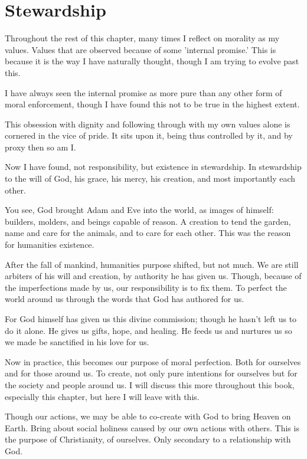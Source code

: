 \section{Stewardship}
\par Throughout the rest of this chapter, many times I reflect on morality as my values. Values that are observed because of some 'internal promise.' This is because it is the way I have naturally thought, though I am trying to evolve past this.
\par I have always seen the internal promise as more pure than any other form of moral enforcement, though I have found this not to be true in the highest extent.
\par This obsession with dignity and following through with my own values alone is cornered in the vice of pride. It sits upon it, being thus controlled by it, and by proxy then so am I.
\par Now I have found, not responsibility, but existence in stewardship. In stewardship to the will of God, his grace, his mercy, his creation, and most importantly each other.
\par You see, God brought Adam and Eve into the world, as images of himself: builders, molders, and beings capable of reason. A creation to tend the garden, name and care for the animals, and to care for each other. This was the reason for humanities existence.
\par After the fall of mankind, humanities purpose shifted, but not much. We are still arbiters of his will and creation, by authority he has given us. Though, because of the imperfections made by us, our responsibility is to fix them. To perfect the world around us through the words that God has authored for us.
\par For God himself has given us this divine commission; though he hasn't left us to do it alone. He gives us gifts, hope, and healing. He feeds us and nurtures us so we made be sanctified in his love for us.
\par Now in practice, this becomes our purpose of moral perfection. Both for ourselves and for those around us. To create, not only pure intentions for ourselves but for the society and people around us. I will discuss this more throughout this book, especially this chapter, but here I will leave with this.
\par Though our actions, we may be able to co-create with God to bring Heaven on Earth. Bring about social holiness caused by our own actions with others. This is the purpose of Christianity, of ourselves. Only secondary to a relationship with God.
